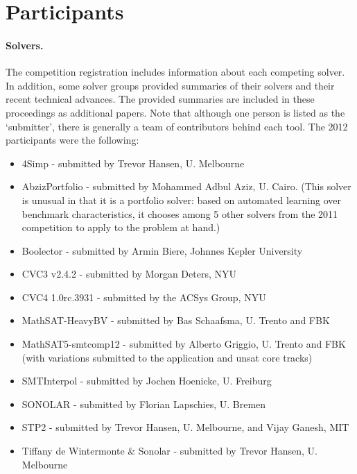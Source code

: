 \documentclass{llncs}
\begin{document}
\section{Participants}

\paragraph{Solvers.} The competition registration includes information about each competing solver. In addition, some solver groups provided summaries of their solvers and their recent technical advances. The provided summaries are included in these proceedings as additional papers. Note that although one person is listed as the `submitter', there is generally a team of contributors behind each tool. The 2012 participants were the following:
\begin{itemize}
\item 4Simp - submitted by Trevor Hansen, U. Melbourne
\item AbzizPortfolio - submitted by Mohammed Adbul Aziz, U. Cairo. (This solver is unusual in that it is a portfolio solver: based on automated learning over benchmark characteristics, it chooses among 5 other solvers from the 2011 competition to apply to the problem at hand.)
\item Boolector - submitted by Armin Biere, Johnnes Kepler University
\item CVC3 v2.4.2 - submitted by Morgan Deters, NYU
\item CVC4 1.0rc.3931 - submitted by the ACSys Group, NYU
\item MathSAT-HeavyBV - submitted by Bas Schaafsma, U. Trento and FBK
\item MathSAT5-smtcomp12 - submitted by Alberto Griggio, U. Trento and FBK (with variations submitted to the application and unsat core tracks)
\item SMTInterpol - submitted by Jochen Hoenicke, U. Freiburg
\item SONOLAR - submitted by Florian Lapschies, U. Bremen
\item STP2 - submitted by Trevor Hansen, U. Melbourne, and Vijay Ganesh, MIT
\item Tiffany de Wintermonte \& Sonolar - submitted by Trevor Hansen, U. Melbourne
\end{itemize}
\end{document}
